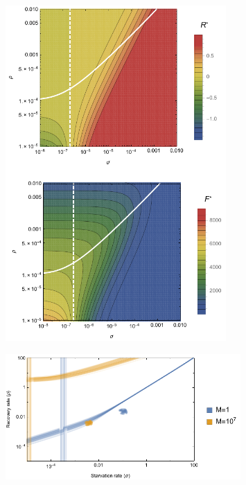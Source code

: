 \documentclass[12pt,english]{article}
\begin{document}
\begin{spacing}{1.9}
\begin{table}[h]
\begin{center}
\begin{tabular}{| p{1.2cm}| p{3.2cm} | p{2.6cm} | p{3.2cm} | }
      
   \hline
    \end{tabular}
    \end{center}
   \end{table}

\clearpage


 \begin{figure}[h]
 	\centering
 	\includegraphics[width=0.75\textwidth]{fig_FixedPoint.pdf}
 	\caption{
 	}
 	\label{Hopfb}
 \end{figure}


 \begin{figure}[h]
 	\centering
 	\includegraphics[width=0.8\textwidth]{fig_DataHopf.pdf}
 	\caption{
 	}
 	\label{DataHopf}
 \end{figure}
 

\end{spacing}
\end{document}
